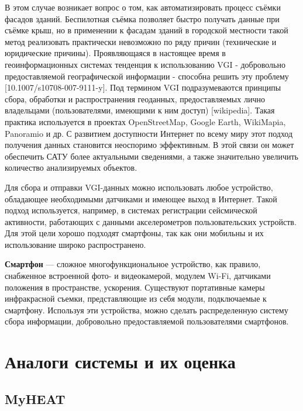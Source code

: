 	В этом случае возникает вопрос о том, как автоматизировать процесс съёмки фасадов зданий. Беспилотная съёмка позволяет быстро получать данные при съёмке крыш, но в применении к фасадам зданий в городской местности такой метод реализовать практически невозможно по ряду причин (технические и юридические причины). Проявляющаяся в настоящее время в геоинформационных системах тенденция к использованию {VGI} - добровольно предоставляемой географической информации - способна решить эту проблему [10.1007/s10708-007-9111-y]. Под термином {VGI} подразумеваются принципы сбора, обработки и распространения геоданных, предоставляемых лично владельцами (пользователями, имеющими к ним доступ) [wikipedia]. Такая практика используется в проектах {OpenStreetMap}, {Google Earth}, {WikiMapia}, {Panoramio} и др. С развитием доступности Интернет по всему миру этот подход получения данных становится неоспоримо эффективным. В этой связи он может обеспечить САТУ более актуальными сведениями, а также значительно увеличить количество анализируемых объектов. 

	Для сбора и отправки {VGI}-данных можно использовать любое устройство, обладающее необходимыми датчиками и имеющее выход в Интернет.  Такой подход используется, например, в системах регистрации сейсмической активности, работающих с данными акселерометров пользовательских устройств. Для этой цели хорошо подходят смартфоны, так как они мобильны и их использование широко распространено.

	\textbf{Смартфон} --- сложное многофункциональное устройство, как правило, снабженное встроенной фото- и видеокамерой, модулем {Wi-Fi}, датчиками положения в пространстве, ускорения. Существуют портативные камеры инфракрасной съемки, представляющие из себя модули, подключаемые к смартфону. Используя эти устройства, можно сделать распределенную систему сбора информации, добровольно предоставляемой пользователями смартфонов. 


\section{Аналоги системы и их оценка}

\subsection{MyHEAT}

